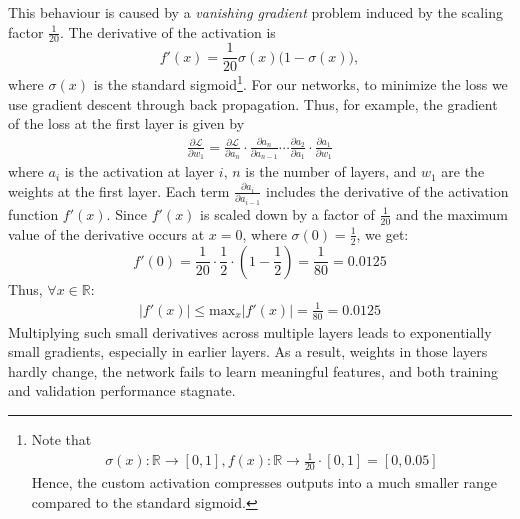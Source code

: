 {{This behaviour is caused by a \emph{vanishing gradient} problem induced by the scaling factor $\tfrac{1}{20}$. The derivative of the activation is
\[
    f'(x) = \frac{1}{20} \sigma(x)\bigl(1 - \sigma(x)\bigr),
\]
where $\sigma(x)$ is the standard sigmoid\footnote{
    Note that \begin{align*}
        \sigma(x): \mathbb{R} \to [0, 1],
        f(x): \mathbb{R} \to \frac{1}{20} \cdot [0, 1] = [0, 0.05]
    \end{align*}
    Hence, the custom activation compresses outputs into a much smaller range compared to the standard sigmoid.}.
    For our networks, to minimize the loss we use gradient descent through back propagation. Thus, for example, the gradient of the loss at the first layer is given by \begin{align*}
        \frac{\partial \mathcal{L}}{\partial w_1} = \frac{\partial \mathcal{L}}{\partial a_n} \cdot \frac{\partial a_n}{\partial a_{n-1}} \cdots \frac{\partial a_2}{\partial a_1} \cdot \frac{\partial a_1}{\partial w_1}
\end{align*}
where $a_i$ is the activation at layer $i$, $n$ is the number of layers, and $w_1$ are the weights at the first layer. Each term $\frac{\partial a_i}{\partial a_{i-1}}$ includes the derivative of the activation function $f'(x)$. Since $f'(x)$ is scaled down by a factor of $\frac{1}{20}$ and the maximum value of the derivative occurs at $x = 0$, where $\sigma(0) = \frac{1}{2}$, we get:
\begin{equation}
        f'(0) = \frac{1}{20} \cdot \frac{1}{2} \cdot (1 - \frac{1}{2}) = \frac{1}{80} = 0.0125
\end{equation}
Thus, $\forall x\in \mathbb{R}$:
\begin{align*}
    |f'(x)| \leq \text{max}_{x} |f'(x)| = \frac{1}{80} = 0.0125
\end{align*}
Multiplying such small derivatives across multiple layers leads to exponentially small gradients, especially in earlier layers. As a result, weights in those layers hardly change, the network fails to learn meaningful features, and both training and validation performance stagnate.

}}
